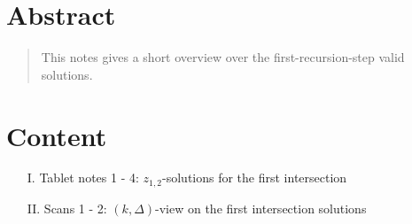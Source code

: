 \newpage
\section*{Abstract}
\label{s:abstract}
\begin{abstract}
	This notes gives a short overview over the first-recursion-step valid solutions.
\end{abstract}
\section*{Content}
\label{s:content}
\begin{enumerate}
	\item [I.] Tablet notes 1 - 4: $z_{1,2}$-solutions for the first intersection
	\item [II.] Scans 1 - 2: $\left(k,\Delta\right)$-view on the first intersection solutions
\end{enumerate}

